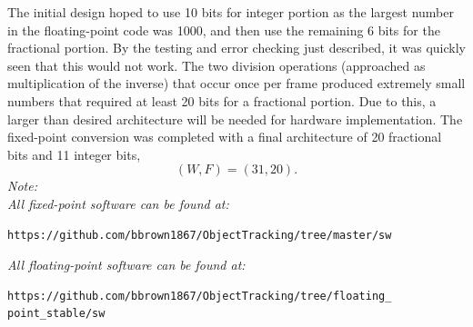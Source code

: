 \documentclass[11pt]{article} %
\begin{document}
The initial design hoped to use 10 bits for integer portion as the largest number in the floating-point code was 1000, and then use the remaining 6 bits for the fractional portion. By the testing and error checking just described, it was quickly seen that this would not work. The two division operations (approached as multiplication of the inverse) that occur once per frame produced extremely small numbers that required at least 20 bits for a fractional portion. Due to this, a larger than desired architecture will be needed for hardware implementation. The fixed-point conversion was completed with a final architecture of 20 fractional bits and 11 integer bits, 
\[
(W,F) = (31,20).
\]
\textit{Note: }\\
\textit{All fixed-point software can be found at: }
\begin{verbatim}
https://github.com/bbrown1867/ObjectTracking/tree/master/sw
\end{verbatim}
\textit{All floating-point software can be found at:} 
\begin{verbatim} 
https://github.com/bbrown1867/ObjectTracking/tree/floating_
point_stable/sw
\end{verbatim}
\end{document}
